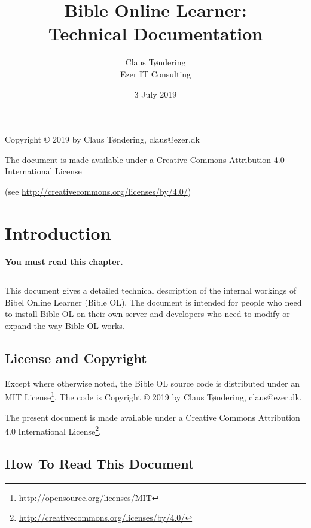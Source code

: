 \documentclass[11pt,oneside,a4paper]{memoir}
\title{Bible Online Learner:\\Technical Documentation}
\author{Claus Tøndering\\Ezer IT Consulting}
\date{3 July 2019}
\begin{document}
\begin{titlingpage*}
\maketitle

\begin{center}
Copyright © 2019 by Claus Tøndering, claus@ezer.dk

\vspace{5mm}

The document is made available under a Creative Commons Attribution 4.0 International License

(see \url{http://creativecommons.org/licenses/by/4.0/})
\end{center}
\end{titlingpage*}


\clearpage
\tableofcontents
{} %

\chapter{Introduction}

\textbf{You must read this chapter.}
\plainbreak{3}

This document gives a detailed technical description of the internal workings of Bibel Online
Learner (Bible OL). The document is intended for people who need to install Bible OL on their own
server and developers who need to modify or expand the way Bible OL works.

\section{License and Copyright}

Except where otherwise noted, the Bible OL source code is distributed under an MIT
License\footnote{\url{http://opensource.org/licenses/MIT}}. The code is Copyright © 2019 by Claus
Tøndering, claus@ezer.dk.

The present document is made available under a Creative Commons Attribution 4.0 International
License\footnote{\url{http://creativecommons.org/licenses/by/4.0/}}.


\section{How To Read This Document}
\end{document}
